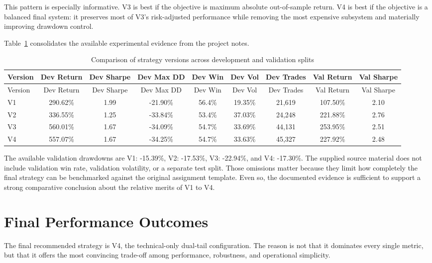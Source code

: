 \documentclass[11pt,twoside,a4paper]{article}
\begin{document}
This pattern is especially informative. V3 is best if the objective is maximum absolute out-of-sample return. V4 is best if the objective is a balanced final system: it preserves most of V3's risk-adjusted performance while removing the most expensive subsystem and materially improving drawdown control.

Table~\ref{tab:results} consolidates the available experimental evidence from the project notes.

\begin{longtable}{@{}lcccccccc@{}}
\caption{Comparison of strategy versions across development and validation splits}
\label{tab:results}\\
\toprule
Version & Dev Return & Dev Sharpe & Dev Max DD & Dev Win & Dev Vol & Dev Trades & Val Return & Val Sharpe \\
\midrule
\endfirsthead
\toprule
Version & Dev Return & Dev Sharpe & Dev Max DD & Dev Win & Dev Vol & Dev Trades & Val Return & Val Sharpe \\
\midrule
\endhead
V1 & 290.62\% & 1.99 & -21.90\% & 56.4\% & 19.35\% & 21,619 & 107.50\% & 2.10 \\
V2 & 336.55\% & 1.25 & -33.84\% & 53.4\% & 37.03\% & 24,248 & 221.88\% & 2.76 \\
V3 & 560.01\% & 1.67 & -34.09\% & 54.7\% & 33.69\% & 44,131 & 253.95\% & 2.51 \\
V4 & 557.07\% & 1.67 & -34.25\% & 54.7\% & 33.63\% & 45,327 & 227.92\% & 2.48 \\
\bottomrule
\end{longtable}

The available validation drawdowns are V1: -15.39\%, V2: -17.53\%, V3: -22.94\%, and V4: -17.30\%. The supplied source material does not include validation win rate, validation volatility, or a separate test split. Those omissions matter because they limit how completely the final strategy can be benchmarked against the original assignment template. Even so, the documented evidence is sufficient to support a strong comparative conclusion about the relative merits of V1 to V4.

\section{Final Performance Outcomes}
The final recommended strategy is V4, the technical-only dual-tail configuration. The reason is not that it dominates every single metric, but that it offers the most convincing trade-off among performance, robustness, and operational simplicity.
\end{document}
